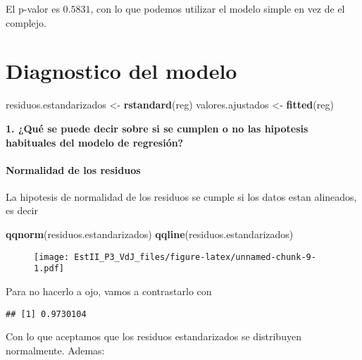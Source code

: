 \documentclass[]{article}
\newenvironment{Shaded}{\begin{snugshade}}{\end{snugshade}}
\newcommand{\KeywordTok}[1]{\textcolor[rgb]{0.13,0.29,0.53}{\textbf{{#1}}}}
\newcommand{\StringTok}[1]{\textcolor[rgb]{0.31,0.60,0.02}{{#1}}}
\newcommand{\NormalTok}[1]{{#1}}
\begin{document}
El p-valor es \(0.5831\), con lo que podemos utilizar el modelo simple
en vez de el complejo.

\section{Diagnostico del modelo}

\begin{Shaded}
\begin{Highlighting}[]
\NormalTok{residuos.estandarizados <-}\StringTok{ }\KeywordTok{rstandard}\NormalTok{(reg)}
\NormalTok{valores.ajustados <-}\StringTok{ }\KeywordTok{fitted}\NormalTok{(reg)}
\end{Highlighting}
\end{Shaded}

\textbf{1. ¿Qué se puede decir sobre si se cumplen o no las hipotesis
habituales del modelo de regresión?}

\paragraph{Normalidad de los residuos}

La hipotesis de normalidad de los residuos se cumple si los datos estan
alineados, es decir

\begin{Shaded}
\begin{Highlighting}[]
\KeywordTok{qqnorm}\NormalTok{(residuos.estandarizados)}
\KeywordTok{qqline}\NormalTok{(residuos.estandarizados)}
\end{Highlighting}
\end{Shaded}

\begin{figure}[htbp]
\centering
\texttt{[image: EstII\_P3\_VdJ\_files/figure-latex/unnamed-chunk-9-1.pdf]}
\caption{}
\end{figure}

Para no hacerlo a ojo, vamos a contrastarlo con

\begin{Shaded}
\end{Shaded}

\begin{verbatim}
## [1] 0.9730104
\end{verbatim}

Con lo que aceptamos que los residuos estandarizados se distribuyen
normalmente. Ademas:
\end{document}
